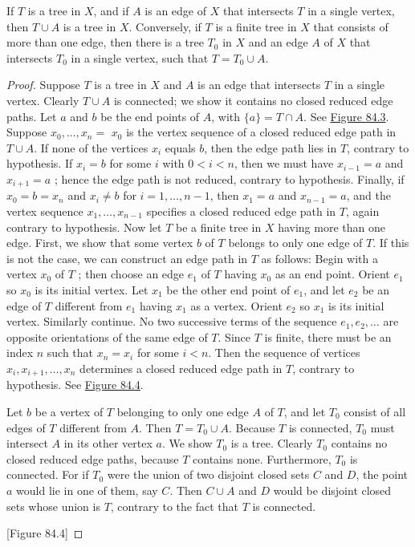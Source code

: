 \begin{lemma}
\label{lem:\thetheorem}
	If \(T\) is a tree in \(X\), and if \(A\) is an edge of \(X\) that intersects \(T\) in a single vertex, then \(T \cup A\) is a tree in \(X\). Conversely, if \(T\) is a finite tree in \(X\) that consists of more than one edge, then there is a tree \(T_{0}\) in \(X\) and an edge \(A\) of \(X\) that intersects \(T_{0}\) in a single vertex, such that \(T = T_{0} \cup A\).
\end{lemma}

\begin{proof}
	Suppose \(T\) is a tree in \(X\) and \(A\) is an edge that intersects \(T\) in a single vertex. Clearly \(T \cup A\) is connected; we show it contains no closed reduced edge paths. Let \(a\) and \(b\) be the end points of \(A\), with \(\{ a\} = T \cap A\). See \hyperref[fig:84.3]{Figure 84.3}. Suppose \(x_{0},\ldots ,x_{n} =\) \(x_{0}\) is the vertex sequence of a closed reduced edge path in \(T \cup A\). If none of the vertices \(x_{i}\) equals \(b\), then the edge path lies in \(T\), contrary to hypothesis. If \(x_{i} = b\) for some \(i\) with \(0 < i < n\), then we must have \(x_{i - 1} = a\) and \(x_{i + 1} = a\) ; hence the edge path is not reduced, contrary to hypothesis. Finally, if \(x_{0} = b = x_{n}\) and \(x_{i} \neq b\) for \(i = 1,\ldots, n - 1\), then \(x_{1} = a\) and \(x_{n - 1} = a\), and the vertex sequence \(x_{1},\ldots ,x_{n - 1}\) specifies a closed reduced edge path in \(T\), again contrary to hypothesis.
Now let \(T\) be a finite tree in \(X\) having more than one edge. First, we show that some vertex \(b\) of \(T\) belongs to only one edge of \(T\). If this is not the case, we can construct an edge path in \(T\) as follows: Begin with a vertex \(x_{0}\) of \(T\) ; then choose an edge \(e_{1}\) of \(T\) having \(x_{0}\) as an end point. Orient \(e_{1}\) so \(x_{0}\) is its initial vertex. Let \(x_{1}\) be the other end point of \(e_{1}\), and let \(e_{2}\) be an edge of \(T\) different from \(e_{1}\) having \(x_{1}\) as a vertex. Orient \(e_{2}\) so \(x_{1}\) is its initial vertex. Similarly continue. No two successive terms of the sequence \(e_{1},e_{2},\ldots\) are opposite orientations of the same edge of \(T\). Since \(T\) is finite, there must be an index \(n\) such that \(x_{n} = x_{i}\) for some \(i < n\). Then the sequence of vertices \(x_{i},x_{i + 1},\ldots ,x_{n}\) determines a closed reduced edge path in \(T\), contrary to hypothesis. See \hyperref[fig:84.4]{Figure 84.4}.

Let \(b\) be a vertex of \(T\) belonging to only one edge \(A\) of \(T\), and let \(T_{0}\) consist of all edges of \(T\) different from \(A\). Then \(T = T_{0} \cup A\). Because \(T\) is connected, \(T_{0}\) must intersect \(A\) in its other vertex \(a\). We show \(T_{0}\) is a tree. Clearly \(T_{0}\) contains no closed reduced edge paths, because \(T\) contains none. Furthermore, \(T_{0}\) is connected. For if \(T_{0}\) were the union of two disjoint closed sets \(C\) and \(D\), the point \(a\) would lie in one of them, say \(C\). Then \(C \cup A\) and \(D\) would be disjoint closed sets whose union is \(T\), contrary to the fact that \(T\) is connected.

[Figure 84.4]
\end{proof}
